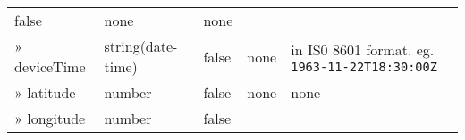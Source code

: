 \documentclass[
]{article}
\begin{document}
\begin{longtable}[]{@{}lllll@{}}
\begin{minipage}[t]{0.17\columnwidth}
false\strut
\end{minipage} & \begin{minipage}[t]{0.17\columnwidth}\raggedright
none\strut
\end{minipage} & \begin{minipage}[t]{0.17\columnwidth}\raggedright
none\strut
\end{minipage}\tabularnewline
\begin{minipage}[t]{0.17\columnwidth}\raggedright
» deviceTime\strut
\end{minipage} & \begin{minipage}[t]{0.17\columnwidth}\raggedright
string(date-time)\strut
\end{minipage} & \begin{minipage}[t]{0.17\columnwidth}\raggedright
false\strut
\end{minipage} & \begin{minipage}[t]{0.17\columnwidth}\raggedright
none\strut
\end{minipage} & \begin{minipage}[t]{0.17\columnwidth}\raggedright
in IS0 8601 format. eg. \texttt{1963-11-22T18:30:00Z}\strut
\end{minipage}\tabularnewline
\begin{minipage}[t]{0.17\columnwidth}\raggedright
» latitude\strut
\end{minipage} & \begin{minipage}[t]{0.17\columnwidth}\raggedright
number\strut
\end{minipage} & \begin{minipage}[t]{0.17\columnwidth}\raggedright
false\strut
\end{minipage} & \begin{minipage}[t]{0.17\columnwidth}\raggedright
none\strut
\end{minipage} & \begin{minipage}[t]{0.17\columnwidth}\raggedright
none\strut
\end{minipage}\tabularnewline
\begin{minipage}[t]{0.17\columnwidth}\raggedright
» longitude\strut
\end{minipage} & \begin{minipage}[t]{0.17\columnwidth}\raggedright
number\strut
\end{minipage} & \begin{minipage}[t]{0.17\columnwidth}\raggedright
false\strut
\end{minipage} & \begin{minipage}[t]{0.17\columnwidth}\raggedright

\end{minipage}
\end{longtable}
\end{document}
